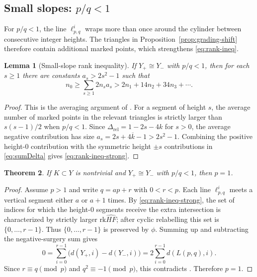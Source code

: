 \documentclass[12pt]{amsart}
\newtheorem{theorem}{Theorem}[section]
\newtheorem{lemma}[theorem]{Lemma}
\theoremstyle{definition}
\theoremstyle{definition}
\newcommand{\HFhat}{\widehat{HF}}
\newcommand{\rk}{\text{rk}}
\newcommand{\Drel}{\Delta_{\mathrm{rel}}}
\newcommand{\din}{d}
\begin{document}
\subsection{Small slopes: $p/q < 1$}

For $p/q<1$, the line $\ell^i_{p,q}$ wraps more than once around the cylinder
between consecutive integer heights.  The triangles in
Proposition~\ref{prop:grading-shift} therefore contain additional marked points,
which strengthens \eqref{eq:rank-ineq}.

\begin{lemma}[Small-slope rank inequality]\label{lem:rank-ineq-strong}
If $Y_+\cong Y_-$ with $p/q<1$, then for each $s\ge1$ there are constants
$a_s>2s^2-1$ such that
\begin{equation}\label{eq:rank-ineq-strong}
n_0\ge \sum_{s\ge1}2n_s a_s
   >2n_1+14n_2+34n_3+\cdots.
\end{equation}
\end{lemma}

\begin{proof}
This is the  averaging argument of \cite[Theorem~28]{Han}.  For a segment
of height $s$, the average number of marked points in the relevant triangles is
strictly larger than $s(s-1)/2$ when $p/q<1$.  Since
$\Drel=1-2s-4k$ for $s>0$, the average negative contribution has size
$a_s=2s+4\overline{k}-1>2s^2-1$.  Combining the positive height-$0$
contribution with the symmetric height $\pm s$ contributions in
\eqref{eq:sumDelta} gives \eqref{eq:rank-ineq-strong}.
\end{proof}

\begin{theorem}\label{thm:small-slopes}
If $K\subset Y$ is nontrivial and $Y_+\cong Y_-$ with $p/q<1$, then $p=1$.
\end{theorem}

\begin{proof}
Assume $p>1$ and write $q=ap+r$ with $0<r<p$.  Each line $\ell^i_{p,q}$ meets
a vertical segment either $a$ or $a+1$ times.  By
\eqref{eq:rank-ineq-strong}, the set of indices for which the height-$0$
segments receive the extra intersection is characterized by strictly larger
$\rk\HFhat$; after cyclic relabelling this set is
$\{0,\ldots,r-1\}$.  Thus $\{0,\ldots,r-1\}$ is preserved by $\phi$. Summing up
and subtracting the negative-surgery sum gives
\[
0=
\sum_{i=0}^{r-1}\bigl(\din(Y_+,i)-\din(Y_-,i)\bigr)
=2\sum_{i=0}^{r-1}\din(L(p,q),i).
\]
Since $r\equiv q\pmod p$ and $q^2\equiv -1\pmod p$, this contradicts
\cite[Lemma~23]{Han}. Therefore $p=1$.
\end{proof}
\end{document}
